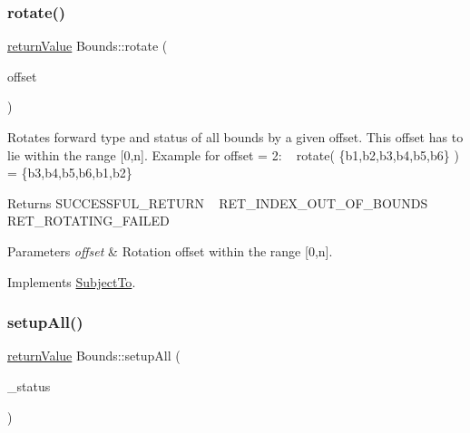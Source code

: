 \subsubsection{\texorpdfstring{rotate()}{rotate()}}
{\footnotesize\ttfamily \hyperlink{_message_handling_8hpp_a81d556f613bfbabd0b1f9488c0fa865e}{return\+Value} Bounds\+::rotate (\begin{DoxyParamCaption}\item[{\hyperlink{_types_8hpp_ab6fd6105e64ed14a0c9281326f05e623}{int\+\_\+t}}]{offset }\end{DoxyParamCaption})\hspace{0.3cm}{\ttfamily [virtual]}}

Rotates forward type and status of all bounds by a given offset. This offset has to lie within the range \mbox{[}0,n\mbox{]}. Example for offset = 2\+: ~\newline
rotate( \{b1,b2,b3,b4,b5,b6\} ) = \{b3,b4,b5,b6,b1,b2\} \begin{DoxyReturn}{Returns}
S\+U\+C\+C\+E\+S\+S\+F\+U\+L\+\_\+\+R\+E\+T\+U\+RN ~\newline
 R\+E\+T\+\_\+\+I\+N\+D\+E\+X\+\_\+\+O\+U\+T\+\_\+\+O\+F\+\_\+\+B\+O\+U\+N\+DS ~\newline
 R\+E\+T\+\_\+\+R\+O\+T\+A\+T\+I\+N\+G\+\_\+\+F\+A\+I\+L\+ED 
\end{DoxyReturn}

\begin{DoxyParams}{Parameters}
{\em offset} & Rotation offset within the range \mbox{[}0,n\mbox{]}. \\
\hline
\end{DoxyParams}


Implements \hyperlink{class_subject_to_a6e3b466f01422cc7361e7a8d1f007aa6}{Subject\+To}.

\mbox{\label{class_bounds_ac8733669924bba05b64b3a0fb2e5c784}} 
\subsubsection{\texorpdfstring{setup\+All()}{setupAll()}}
{\footnotesize\ttfamily \hyperlink{_message_handling_8hpp_a81d556f613bfbabd0b1f9488c0fa865e}{return\+Value} Bounds\+::setup\+All (\begin{DoxyParamCaption}\item[{\hyperlink{_types_8hpp_a70a6a40d261a015ead8d43aa589383a4}{Subject\+To\+Status}}]{\+\_\+status }\end{DoxyParamCaption})\hspace{0.3cm}{\ttfamily [protected]}}

